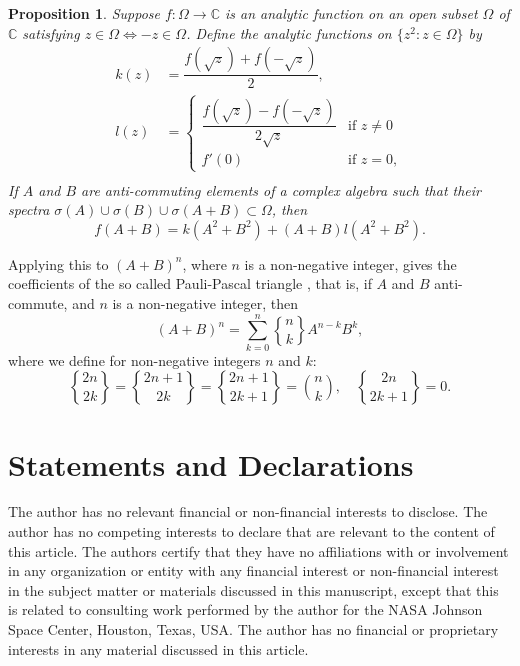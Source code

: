 \documentclass[12pt,reqno]{amsart}
\newtheorem{prop}[theorem]{Proposition}
\begin{document}
\begin{prop}
\label{analytic}
Suppose $f:\Omega \to \mathbb C$ is an analytic function on an open subset $\Omega$ of $\mathbb C$ satisfying $z \in \Omega \Leftrightarrow -z \in \Omega$.  Define the analytic functions on $\{z^2 : z \in \Omega\}$ by
\begin{align}
\label{g a}
k(z) &= \dfrac{f(\sqrt z) + f(-\sqrt z)}{2} ,\\
\label{h a}
l(z) &= \begin{cases}
\dfrac{f(\sqrt z) - f(-\sqrt z)}{2\sqrt z} &\text{if $z \ne 0$} \\
f'(0) &\text{if $z = 0$} ,
\end{cases} \\
\end{align}
If $A$ and $B$ are anti-commuting elements of a complex algebra such that their spectra $\sigma(A) \cup \sigma(B) \cup \sigma(A+B) \subset \Omega$, then
\begin{equation}
f(A+B) = k(A^2+B^2) + (A+B) l(A^2+B^2) .
\end{equation}
\end{prop}

Applying this to $(A+B)^n$, where $n$ is a non-negative integer, gives the coefficients of the so called Pauli-Pascal triangle \cite{horn,sloane}, that is, if $A$ and $B$ anti-commute, and $n$ is a non-negative integer, then
\begin{equation}
(A + B)^n = \sum_{k=0}^n  \genfrac\{\}{0pt}0nk  A^{n-k} B^k ,
\end{equation}
where we define for non-negative integers $n$ and $k$:
\begin{equation}
\genfrac\{\}{0pt}0{2n}{2 k} = \genfrac\{\}{0pt}0{2n + 1}{2 k} =
\genfrac\{\}{0pt}0{2n + 1}{2 k + 1} = \binom n k , \quad
\genfrac\{\}{0pt}0{2n}{2 k + 1}  = 0.
\end{equation}

\section*{Statements and Declarations}

The author has no relevant financial or non-financial interests to disclose.  The author has no competing interests to declare that are relevant to the content of this article.  The authors certify that they have no affiliations with or involvement in any organization or entity with any financial interest or non-financial interest in the subject matter or materials discussed in this manuscript, except that this is related to consulting work performed by the author for the NASA Johnson Space Center, Houston, Texas, USA.  The author has no financial or proprietary interests in any material discussed in this article.
\end{document}

